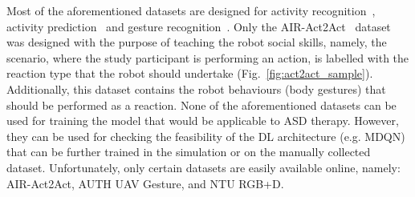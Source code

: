 \documentclass[thesis]{mas_proposal}
\begin{document}
Most of the aforementioned datasets are designed for activity recognition~\cite{Shahroudy_2016_CVPR,Liu2020,ryoo2013firstperson}, activity prediction~\cite{ryoo2015robot} and gesture recognition~\cite{patrona2021overview}. Only the AIR-Act2Act~\cite{Ko2021} dataset was designed with the purpose of teaching the robot social skills, namely, the scenario, where the study participant is performing an action, is labelled with the reaction type that the robot should undertake (Fig.~\ref{fig:act2act_sample}). Additionally, this dataset contains the robot behaviours (body gestures) that should be performed as a reaction. None of the aforementioned datasets can be used for training the model that would be applicable to ASD therapy. However, they can be used for checking the feasibility of the DL architecture (e.g. MDQN) that can be further trained in the simulation or on the manually collected dataset. Unfortunately, only certain datasets are easily available online, namely: AIR-Act2Act, AUTH UAV Gesture, and NTU RGB+D.
\end{document}
